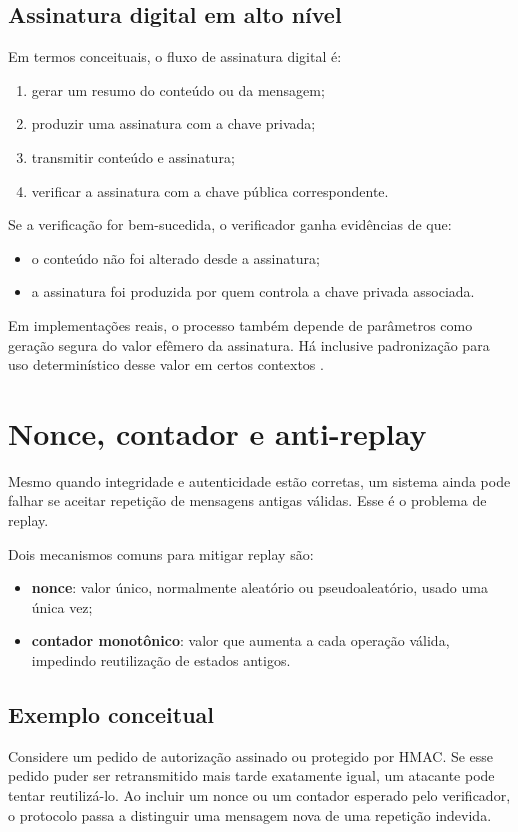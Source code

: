 \subsection{Assinatura digital em alto nível}
Em termos conceituais, o fluxo de assinatura digital é:
\begin{enumerate}[leftmargin=*]
  \item gerar um resumo do conteúdo ou da mensagem;
  \item produzir uma assinatura com a chave privada;
  \item transmitir conteúdo e assinatura;
  \item verificar a assinatura com a chave pública correspondente.
\end{enumerate}

Se a verificação for bem-sucedida, o verificador ganha evidências de que:
\begin{itemize}[leftmargin=*]
  \item o conteúdo não foi alterado desde a assinatura;
  \item a assinatura foi produzida por quem controla a chave privada associada.
\end{itemize}

Em implementações reais, o processo também depende de parâmetros como geração segura do valor efêmero da assinatura. Há inclusive padronização para uso determinístico desse valor em certos contextos \citep{rfc6979}.

\section{Nonce, contador e anti-replay}
Mesmo quando integridade e autenticidade estão corretas, um sistema ainda pode falhar se aceitar repetição de mensagens antigas válidas. Esse é o problema de replay.

Dois mecanismos comuns para mitigar replay são:
\begin{itemize}[leftmargin=*]
  \item \textbf{nonce}: valor único, normalmente aleatório ou pseudoaleatório, usado uma única vez;
  \item \textbf{contador monotônico}: valor que aumenta a cada operação válida, impedindo reutilização de estados antigos.
\end{itemize}

\subsection{Exemplo conceitual}
Considere um pedido de autorização assinado ou protegido por HMAC. Se esse pedido puder ser retransmitido mais tarde exatamente igual, um atacante pode tentar reutilizá-lo. Ao incluir um nonce ou um contador esperado pelo verificador, o protocolo passa a distinguir uma mensagem nova de uma repetição indevida.

